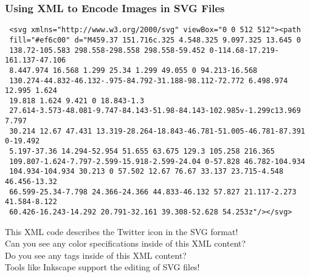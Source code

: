 \documentclass[14pt,aspectratio=169]{beamer}
\begin{document}
%
\begin{frame}[fragile]
  \frametitle{Using XML to Encode Images in SVG Files}
  \normalsize
  \begin{minipage}{6in}
    \vspace*{-.05in}
    \begin{verbatim}
 <svg xmlns="http://www.w3.org/2000/svg" viewBox="0 0 512 512"><path
 fill="#ef6c00" d="M459.37 151.716c.325 4.548.325 9.097.325 13.645 0
 138.72-105.583 298.558-298.558 298.558-59.452 0-114.68-17.219-161.137-47.106
 8.447.974 16.568 1.299 25.34 1.299 49.055 0 94.213-16.568
 130.274-44.832-46.132-.975-84.792-31.188-98.112-72.772 6.498.974 12.995 1.624
 19.818 1.624 9.421 0 18.843-1.3
 27.614-3.573-48.081-9.747-84.143-51.98-84.143-102.985v-1.299c13.969 7.797
 30.214 12.67 47.431 13.319-28.264-18.843-46.781-51.005-46.781-87.391 0-19.492
 5.197-37.36 14.294-52.954 51.655 63.675 129.3 105.258 216.365
 109.807-1.624-7.797-2.599-15.918-2.599-24.04 0-57.828 46.782-104.934
 104.934-104.934 30.213 0 57.502 12.67 76.67 33.137 23.715-4.548 46.456-13.32
 66.599-25.34-7.798 24.366-24.366 44.833-46.132 57.827 21.117-2.273 41.584-8.122
 60.426-16.243-14.292 20.791-32.161 39.308-52.628 54.253z"/></svg>
    \end{verbatim}
  \end{minipage}
  \vspace*{-.1in}
  \begin{center}
    This XML code describes the Twitter icon in the SVG format! \\
    Can you see any color specifications inside of this XML content? \\
    Do you see any tags inside of this XML content? \\
    Tools like Inkscape support the editing of SVG files!
  \end{center}
\end{frame}
\end{document}
